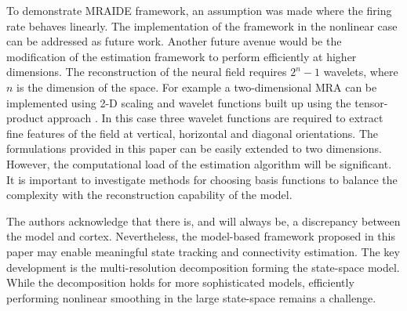 \documentclass[review,authoryear,3p]{elsarticle}
\newcommand{\parham}[1]{\textcolor{red}{#1}}
\begin{document}


To demonstrate MRAIDE framework, an assumption was made where the firing rate behaves linearly. The implementation of the framework in the nonlinear case can be addressed as future work. Another future avenue would be the modification of the estimation framework to perform efficiently at higher dimensions. The reconstruction of the neural field requires $2^n-1$ wavelets, where $n$ is the dimension of the space. For example a two-dimensional MRA can be implemented using 2-D scaling and wavelet functions built up using the tensor-product approach \citep{Meyer1992}. In this case three wavelet functions are required to  extract fine features of the field at vertical, horizontal and diagonal orientations. The formulations provided in this paper can be easily extended to two dimensions. However, the computational load of the estimation algorithm will be significant. It is important to investigate methods for choosing basis functions to balance the complexity with the reconstruction capability of the model.
 
The authors acknowledge that there is, and will always be, a discrepancy between the model and cortex. Nevertheless, the model-based framework proposed in this paper may enable meaningful state tracking and connectivity estimation. The key development is the multi-resolution decomposition forming the state-space model. While the decomposition holds for more sophisticated models, efficiently performing nonlinear smoothing in the large state-space remains a challenge. 
\end{document}
